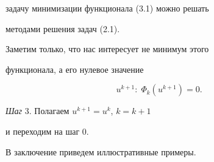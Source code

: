 задачу минимизации функционала (3.1) можно решать


методами решения задач (2.1). 


Заметим только, что нас интересует не минимум этого 


функционала, а его нулевое значение


$$


u^{k+1}:\; \Phi_k(u^{k+1})=0.


$$





{\it Шаг} 3. Полагаем $u^{k+1}=u^k$, $k=k+1$


и переходим на {шаг 0.}





В заключение приведем иллюстративные примеры.





